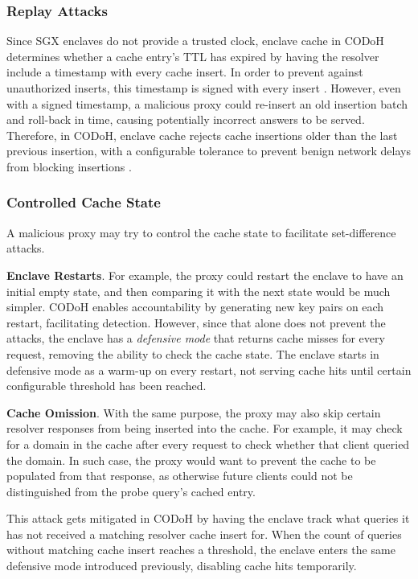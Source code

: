 \documentclass[a4paper]{article}
\begin{document}
\subsubsection{Replay Attacks}
Since SGX enclaves do not provide a trusted clock, enclave cache in CODoH determines whether a cache entry's TTL has expired by having the resolver include a timestamp with every cache insert. In order to prevent against unauthorized inserts, this timestamp is signed with every insert \citep{niroula2026codoh}. However, even with a signed timestamp, a malicious proxy could re-insert an old insertion batch and roll-back in time, causing potentially incorrect answers to be served. Therefore, in CODoH, enclave cache rejects cache insertions older than the last previous insertion, with a configurable tolerance to prevent benign network delays from blocking insertions \citep{niroula2026codoh}.

\subsubsection{Controlled Cache State}

A malicious proxy may try to control the cache state to facilitate set-difference attacks.

\textbf{Enclave Restarts}. For example, the proxy could restart the enclave to have an initial empty state, and then comparing it with the next state would be much simpler. CODoH \citep{niroula2026codoh} enables accountability by generating new key pairs on each restart, facilitating detection. However, since that alone does not prevent the attacks, the enclave has a \textit{defensive mode} that returns cache misses for every request, removing the ability to check the cache state. The enclave starts in defensive mode as a warm-up on every restart, not serving cache hits until certain configurable threshold has been reached.

\textbf{Cache Omission}. With the same purpose, the proxy may also skip certain resolver responses from being inserted into the cache. For example, it may check for a domain in the cache after every request to check whether that client queried the domain. In such case, the proxy would want to prevent the cache to be populated from that response, as otherwise future clients could not be distinguished from the probe query's cached entry.

This attack gets mitigated in CODoH \citep{niroula2026codoh} by having the enclave track what queries it has not received a matching resolver cache insert for. When the count of queries without matching cache insert reaches a threshold, the enclave enters the same defensive mode introduced previously, disabling cache hits temporarily.
\end{document}
